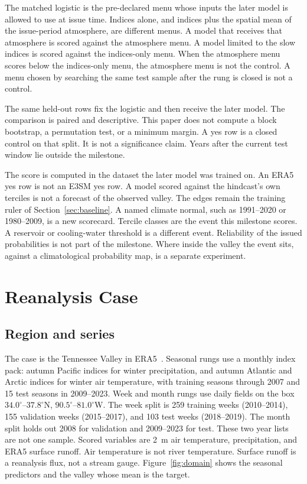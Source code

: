 \documentclass{ametsocV6.2}
\begin{document}
The matched logistic is the pre-declared menu whose inputs the later model is allowed to use at issue time.
Indices alone, and indices plus the spatial mean of the issue-period atmosphere, are different menus.
A model that receives that atmosphere is scored against the atmosphere menu.
A model limited to the slow indices is scored against the indices-only menu.
When the atmosphere menu scores below the indices-only menu, the atmosphere menu is not the control.
A menu chosen by searching the same test sample after the rung is closed is not a control.

The same held-out rows fix the logistic and then receive the later model.
The comparison is paired and descriptive.
This paper does not compute a block bootstrap, a permutation test, or a minimum margin.
A yes row is a closed control on that split.
It is not a significance claim.
Years after the current test window lie outside the milestone.

The score is computed in the dataset the later model was trained on.
An ERA5 yes row is not an E3SM yes row.
A model scored against the hindcast's own terciles is not a forecast of the observed valley.
The edges remain the training ruler of Section~\ref{sec:baseline}.
A named climate normal, such as 1991--2020 or 1980--2009, is a new scorecard.
Tercile classes are the event this milestone scores.
A reservoir or cooling-water threshold is a different event.
Reliability of the issued probabilities is not part of the milestone.
Where inside the valley the event sits, against a climatological probability map, is a separate experiment.

\section{Reanalysis Case}
\label{sec:case}

\subsection{Region and series}
\label{sec:data}

The case is the Tennessee Valley in ERA5~\citep{hersbach2020era5}.
Seasonal rungs use a monthly index pack: autumn Pacific indices for winter precipitation, and autumn Atlantic and Arctic indices for winter air temperature, with training seasons through 2007 and 15 test seasons in 2009--2023.
Week and month rungs use daily fields on the box $34.0^{\circ}$--$37.8^{\circ}$N, $90.5^{\circ}$--$81.0^{\circ}$W.
The week split is 259 training weeks (2010--2014), 155 validation weeks (2015--2017), and 103 test weeks (2018--2019).
The month split holds out 2008 for validation and 2009--2023 for test.
These two year lists are not one sample.
Scored variables are 2~m air temperature, precipitation, and ERA5 surface runoff.
Air temperature is not river temperature.
Surface runoff is a reanalysis flux, not a stream gauge.
Figure~\ref{fig:domain} shows the seasonal predictors and the valley whose mean is the target.
\end{document}
